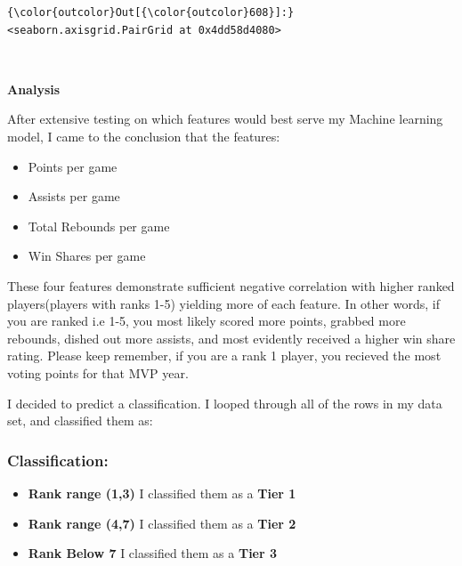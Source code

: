 \documentclass[11pt]{article}
\providecommand{\tightlist}{%
      \setlength{\itemsep}{0pt}\setlength{\parskip}{0pt}}
\begin{document}
\begin{Verbatim}[commandchars=\\\{\}]
{\color{outcolor}Out[{\color{outcolor}608}]:} <seaborn.axisgrid.PairGrid at 0x4dd58d4080>
\end{Verbatim}
            
    \begin{center}
    \end{center}
    { \hspace*{\fill} \\}
    
    \textbf{Analysis} \newline

After extensive testing on which features would best serve my Machine
learning model, I came to the conclusion that the features:

\begin{itemize}
\tightlist
\item
  Points per game
\item
  Assists per game
\item
  Total Rebounds per game
\item
  Win Shares per game
\end{itemize}

These four features demonstrate sufficient negative correlation with
higher ranked players(players with ranks 1-5) yielding more of each
feature. In other words, if you are ranked i.e 1-5, you most likely
scored more points, grabbed more rebounds, dished out more assists, and
most evidently received a higher win share rating. Please keep remember,
if you are a rank 1 player, you recieved the most voting points for that
MVP year.

I decided to predict a classification. I looped through all of the rows
in my data set, and classified them as:

\subsubsection{\texorpdfstring{Classification:}{Classification: }}\label{classification}

\begin{itemize}
\tightlist
\item
  \textbf{Rank range (1,3)} I classified them as a \textbf{Tier 1}
\item
  \textbf{Rank range (4,7)} I classified them as a \textbf{Tier 2}
\item
  \textbf{Rank Below 7} I classified them as a \textbf{Tier 3}
\end{itemize}
\end{document}
